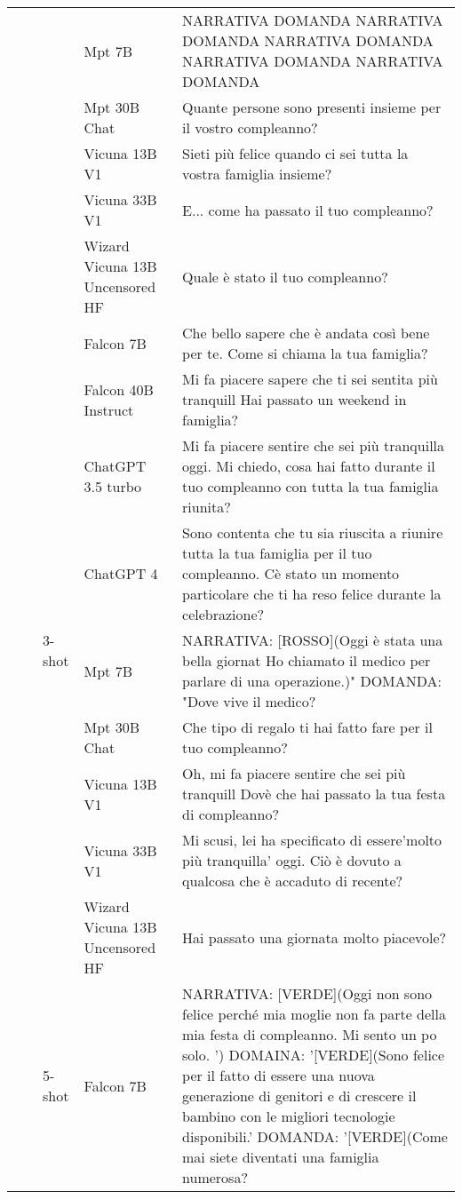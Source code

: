 \begin{center}
\begin{longtable}{l|l|l|p{3cm}|p{8cm}}
 &  &  & Mpt 7B & NARRATIVA DOMANDA NARRATIVA DOMANDA NARRATIVA DOMANDA NARRATIVA DOMANDA NARRATIVA DOMANDA \\
 &  &  & Mpt 30B Chat & Quante persone sono presenti insieme per il vostro compleanno? \\
 &  &  & Vicuna 13B V1 & Sieti più felice quando ci sei tutta la vostra famiglia insieme? \\
 &  &  & Vicuna 33B V1 & E... come ha passato il tuo compleanno? \\
 &  &  & Wizard Vicuna 13B Uncensored HF &  Quale è stato il tuo compleanno? \\
\cline{3-5}
 &  & \multirow[c]{9}{*}{3-shot} & Falcon 7B & Che bello sapere che è andata così bene per te. Come si chiama la tua famiglia? \\
 &  &  & Falcon 40B Instruct & Mi fa piacere sapere che ti sei sentita più tranquill Hai passato un weekend in famiglia? \\
 &  &  & ChatGPT 3.5 turbo & Mi fa piacere sentire che sei più tranquilla oggi. Mi chiedo, cosa hai fatto durante il tuo compleanno con tutta la tua famiglia riunita? \\
 &  &  & ChatGPT 4 & Sono contenta che tu sia riuscita a riunire tutta la tua famiglia per il tuo compleanno. Cè stato un momento particolare che ti ha reso felice durante la celebrazione? \\
 &  &  & Mpt 7B & NARRATIVA: [ROSSO](Oggi è stata una bella giornat Ho chiamato il medico per parlare di una operazione.)" DOMANDA: "Dove vive il medico? \\
 &  &  & Mpt 30B Chat & Che tipo di regalo ti hai fatto fare per il tuo compleanno? \\
 &  &  & Vicuna 13B V1 & Oh, mi fa piacere sentire che sei più tranquill Dovè che hai passato la tua festa di compleanno? \\
 &  &  & Vicuna 33B V1 &  Mi scusi, lei ha specificato di essere'molto più tranquilla' oggi. Ciò è dovuto a qualcosa che è accaduto di recente? \\
 &  &  & Wizard Vicuna 13B Uncensored HF & Hai passato una giornata molto piacevole? \\
\cline{3-5}
 &  & \multirow[c]{9}{*}{5-shot} & Falcon 7B & NARRATIVA: [VERDE](Oggi non sono felice perché mia moglie non fa parte della mia festa di compleanno. Mi sento un po solo. ') DOMAINA: '[VERDE](Sono felice per il fatto di essere una nuova generazione di genitori e di crescere il bambino con le migliori tecnologie disponibili.' DOMANDA: '[VERDE](Come mai siete diventati una famiglia numerosa? \\

\end{longtable}
\end{center}
